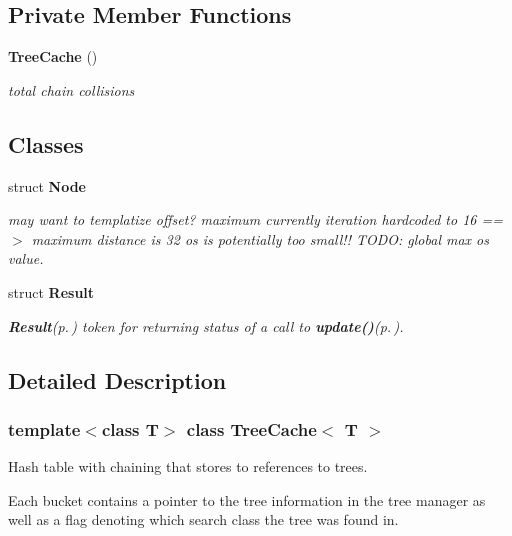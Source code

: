 \subsection*{Private Member Functions}
\begin{CompactItemize}
\item 
{\bf Tree\-Cache} ()
\begin{CompactList}\small\item\em total chain collisions \item\end{CompactList}\end{CompactItemize}
\subsection*{Classes}
\begin{CompactItemize}
\item 
struct {\bf Node}
\begin{CompactList}\small\item\em may want to templatize offset? maximum currently iteration hardcoded to 16 ==$>$ maximum distance is 32 os is potentially too small!! TODO: global max os value. \item\end{CompactList}\item 
struct {\bf Result}
\begin{CompactList}\small\item\em {\bf Result}{\rm (p.\,\pageref{structTreeCache_1_1Result})} token for returning status of a call to {\bf update()}{\rm (p.\,\pageref{classTreeCache_a4})}. \item\end{CompactList}\end{CompactItemize}


\subsection{Detailed Description}
\subsubsection*{template$<$class T$>$ class Tree\-Cache$<$ T $>$}

Hash table with chaining that stores to references to trees. 

Each bucket contains a pointer to the tree information in the tree manager as well as a flag denoting which search class the tree was found in. 



